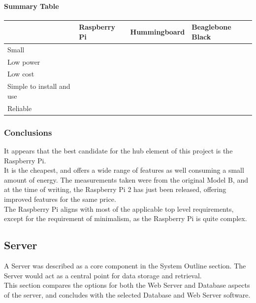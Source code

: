 \documentclass[draft,preprint,12pt,3p]{elsarticle}
\newcommand{\checkmark}{\ding{51}}%
\newcommand{\xmark}{\ding{55}}%
\begin{document}
\paragraph{Summary Table}
\begin{tabular}{| l | l | l | l |}
    \hline
          & Raspberry Pi & Hummingboard & Beaglebone Black \\ \hline
    Small & \checkmark & \checkmark & \checkmark\\ \hline
    Low power & \checkmark & \checkmark & \checkmark\\ \hline
    Low cost & \checkmark & \xmark & \xmark\\ \hline
    Simple to install and use & \checkmark & \checkmark & \checkmark\\ \hline
    Reliable & \checkmark & \checkmark & \checkmark\\ \hline
\end{tabular}

\subsubsection{Conclusions}
It appears that the best candidate for the hub element of this project is the Raspberry Pi.\\
It is the cheapest, and offers a wide range of features as well consuming a small amount of energy. The measurements taken were from the original Model B, and at the time of writing, the Raspberry Pi 2 has just been released, offering improved features for the same price.\\
The Raspberry Pi aligns with most of the applicable top level requirements, except for the requirement of minimalism, as the Raspberry Pi is quite complex.

\clearpage
\subsection{Server}
A Server was described as a core component in the System Outline section. The Server would act as a central point for data storage and retrieval.\\
This section compares the options for both the Web Server and Database aspects of the server, and concludes with the selected Database and Web Server software.
\end{document}
